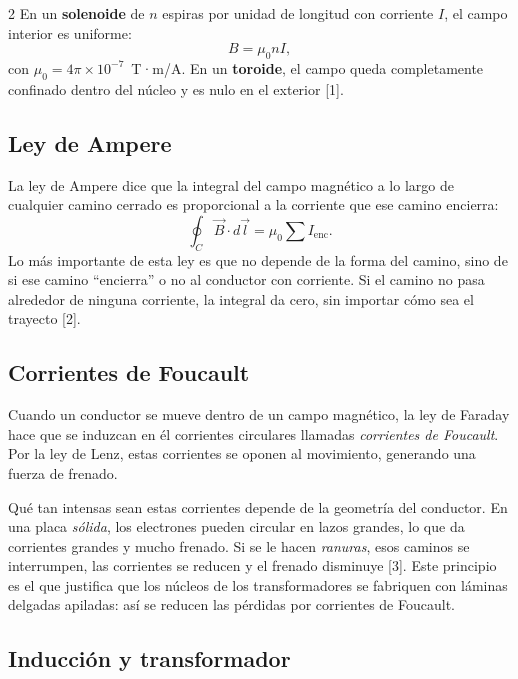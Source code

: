 \documentclass[10pt]{article}
\begin{document}
\begin{multicols}{2}
En un \textbf{solenoide} de $n$ espiras por unidad de longitud con corriente $I$, el campo interior es uniforme:
\begin{equation}
    B = \mu_0 n I,
\end{equation}
con $\mu_0 = 4\pi\times10^{-7}$~T·m/A. En un \textbf{toroide}, el campo queda completamente confinado dentro del núcleo y es nulo en el exterior [1].

\subsection*{Ley de Ampere}

La ley de Ampere dice que la integral del campo magnético a lo largo de cualquier camino cerrado es proporcional a la corriente que ese camino encierra:
\begin{equation}
    \oint_C \vec{B}\cdot d\vec{l} = \mu_0 \sum I_{\text{enc}}.
    \label{eq:ampere}
\end{equation}
Lo más importante de esta ley es que no depende de la forma del camino, sino de si ese camino ``encierra'' o no al conductor con corriente. Si el camino no pasa alrededor de ninguna corriente, la integral da cero, sin importar cómo sea el trayecto [2].

\subsection*{Corrientes de Foucault}

Cuando un conductor se mueve dentro de un campo magnético, la ley de Faraday hace que se induzcan en él corrientes circulares llamadas \emph{corrientes de Foucault}. Por la ley de Lenz, estas corrientes se oponen al movimiento, generando una fuerza de frenado.

Qué tan intensas sean estas corrientes depende de la geometría del conductor. En una placa \emph{sólida}, los electrones pueden circular en lazos grandes, lo que da corrientes grandes y mucho frenado. Si se le hacen \emph{ranuras}, esos caminos se interrumpen, las corrientes se reducen y el frenado disminuye [3]. Este principio es el que justifica que los núcleos de los transformadores se fabriquen con láminas delgadas apiladas: así se reducen las pérdidas por corrientes de Foucault.

\subsection*{Inducción y transformador}


\end{multicols}
\end{document}
